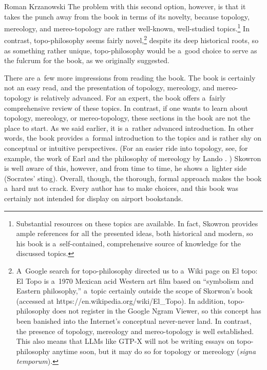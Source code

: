 \begin{newrevengenv}{Roman Krzanowski}
The problem with this second option, however, is that it takes the punch away from the book in terms of its novelty, because topology, mereology, and mereo-topology are rather well-known, well-studied topics.\footnote{Substantial resources on these topics are available. In fact, Skowron provides ample references for all the presented ideas, both historical and modern, so his book is a~self-contained, comprehensive source of knowledge for the discussed topics.} In contrast, topo-philosophy seems fairly novel,\footnote{A~Google search for topo-philosophy directed us to a~Wiki page on El topo: El Topo is a~1970 Mexican acid Western art film based on ``symbolism and Eastern philosophy,'' a~topic certainly outside the scope of Skorwon's book (accessed at https://en.wikipedia.org/wiki/El\_Topo). In addition, topo-philosophy does not register in the Google Ngram Viewer, so this concept has been banished into the Internet's conceptual never-never land. In contrast, the presence of topology, mereology and mereo-topology is well established. This also means that LLMs like GTP-X will not be writing essays on topo-philosophy anytime soon, but it may do so for topology or mereology (\textit{signa temporum}).} despite its deep historical roots, so as something rather unique, topo-philosophy would be a~good choice to serve as the fulcrum for the book, as we originally suggested.



There are a~few more impressions from reading the book. The book is certainly not an easy read, and the presentation of topology, mereology, and mereo-topology is relatively advanced. For an expert, the book offers a~fairly comprehensive review of these topics. In contrast, if one wants to learn about topology, mereology, or mereo-topology, these sections in the book are not the place to start. As we said earlier, it is a~rather advanced introduction. In other words, the book provides a~formal introduction to the topics and is rather shy on conceptual or intuitive perspectives. (For an easier ride into topology, see, for example, the work of Earl 
\parencite*[][]{earl_topology_2019} %
 and the philosophy of mereology by Lando 
\parencite*[][]{lando_mereology_2017}.%
) Skowron is well aware of this, however, and from time to time, he shows a~lighter side (Socrates' sting). Overall, though, the thorough, formal approach makes the book a~hard nut to crack. Every author has to make choices, and this book was certainly not intended for display on airport bookstands.




\end{newrevengenv}
